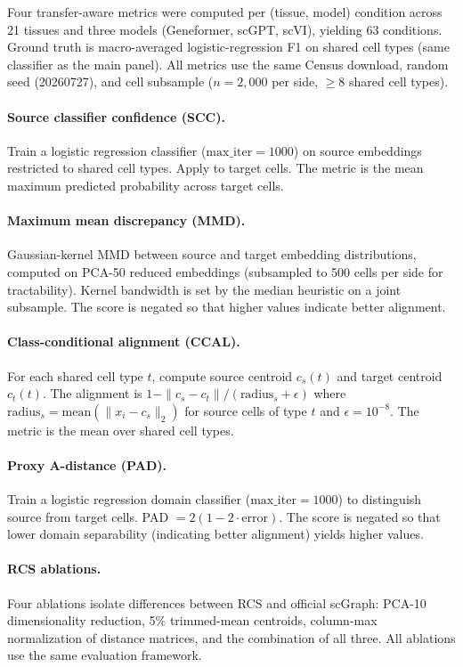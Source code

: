 \documentclass[11pt]{article}
\begin{document}
Four transfer-aware metrics were computed per (tissue, model) condition
across 21 tissues and three models (Geneformer, scGPT, scVI), yielding
63 conditions. Ground truth is macro-averaged logistic-regression F1 on
shared cell types (same classifier as the main panel). All metrics use
the same Census download, random seed (20260727), and cell subsample
($n = 2{,}000$ per side, $\geq 8$ shared cell types).

\paragraph{Source classifier confidence (SCC).} Train a logistic
regression classifier ($\text{max\_iter} = 1000$) on source embeddings
restricted to shared cell types. Apply to target cells. The metric is
the mean maximum predicted probability across target cells.

\paragraph{Maximum mean discrepancy (MMD).} Gaussian-kernel MMD between
source and target embedding distributions, computed on PCA-50 reduced
embeddings (subsampled to 500 cells per side for tractability). Kernel
bandwidth is set by the median heuristic on a joint subsample. The score
is negated so that higher values indicate better alignment.

\paragraph{Class-conditional alignment (CCAL).} For each shared cell
type $t$, compute source centroid $c_s(t)$ and target centroid $c_t(t)$.
The alignment is $1 - \|c_s - c_t\| / (\text{radius}_s + \epsilon)$
where $\text{radius}_s = \text{mean}(\|x_i - c_s\|_2)$ for source cells
of type $t$ and $\epsilon = 10^{-8}$. The metric is the mean over shared
cell types.

\paragraph{Proxy A-distance (PAD).} Train a logistic regression domain
classifier ($\text{max\_iter} = 1000$) to distinguish source from target
cells. PAD $= 2(1 - 2 \cdot \text{error})$. The score is negated so
that lower domain separability (indicating better alignment) yields
higher values.

\paragraph{RCS ablations.} Four ablations isolate differences between
RCS and official scGraph: PCA-10 dimensionality reduction, 5\% trimmed-mean
centroids, column-max normalization of distance matrices, and the
combination of all three. All ablations use the same evaluation
framework.
\end{document}
